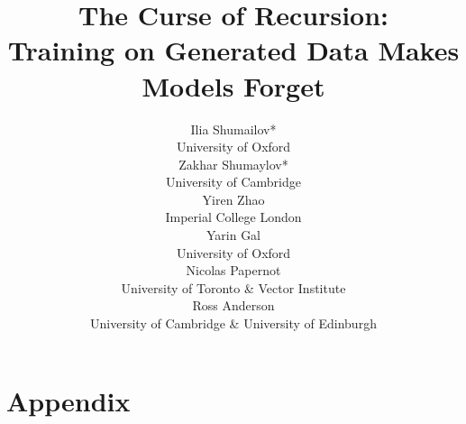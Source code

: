 \documentclass{article}
\title{The Curse of Recursion: \\Training on Generated Data Makes Models Forget}
\author{
  Ilia Shumailov*\\
  University of Oxford\\
  \And
  Zakhar Shumaylov* \\
  University of Cambridge\\
  \And
  Yiren Zhao \\
  Imperial College London\\
  \And 
  Yarin Gal \\
  University of Oxford \\
  \And 
  Nicolas Papernot \\
  University of Toronto \& Vector Institute\\
  \And 
  Ross Anderson \\
  University of Cambridge \& University of Edinburgh\\
}
\theoremstyle{definition}
\begin{document}
\maketitle









  
  

\newpage
\appendix
\section{Appendix}

\end{document}
